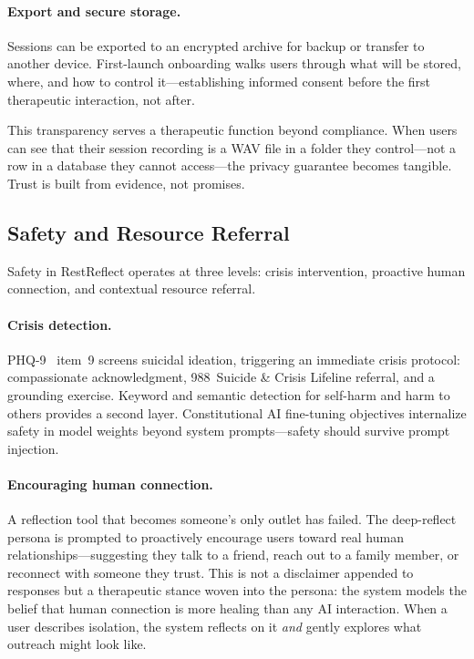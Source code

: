 \documentclass{article}
\begin{document}
\paragraph{Export and secure storage.} Sessions can be exported to an encrypted archive for backup or transfer to another device. First-launch onboarding walks users through what will be stored, where, and how to control it---establishing informed consent before the first therapeutic interaction, not after.

This transparency serves a therapeutic function beyond compliance. When users can see that their session recording is a WAV file in a folder they control---not a row in a database they cannot access---the privacy guarantee becomes tangible. Trust is built from evidence, not promises.

\subsection{Safety and Resource Referral}

Safety in RestReflect operates at three levels: crisis intervention, proactive human connection, and contextual resource referral.

\paragraph{Crisis detection.} PHQ-9~\citep{kroenke2001phq9} item~9 screens suicidal ideation, triggering an immediate crisis protocol: compassionate acknowledgment, 988~Suicide \& Crisis Lifeline referral, and a grounding exercise. Keyword and semantic detection for self-harm and harm to others provides a second layer. Constitutional AI fine-tuning objectives internalize safety in model weights beyond system prompts---safety should survive prompt injection.

\paragraph{Encouraging human connection.} A reflection tool that becomes someone's only outlet has failed. The deep-reflect persona is prompted to proactively encourage users toward real human relationships---suggesting they talk to a friend, reach out to a family member, or reconnect with someone they trust. This is not a disclaimer appended to responses but a therapeutic stance woven into the persona: the system models the belief that human connection is more healing than any AI interaction. When a user describes isolation, the system reflects on it \emph{and} gently explores what outreach might look like.
\end{document}
